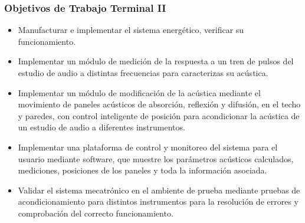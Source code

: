 \subsubsection*{Objetivos de Trabajo Terminal II}
\begin{itemize}
    \item Manufacturar e implementar el sistema energético, verificar su funcionamiento.
    \item Implementar un módulo de medición de la respuesta a un tren de pulsos del estudio de audio a distintas frecuencias para caracterizas su acústica.
    \item Implementar un módulo de modificación de la acústica mediante el movimiento de paneles acústicos de absorción, reflexión y difusión, en el techo y paredes, con control inteligente de posición para acondicionar la acústica de un estudio de audio a diferentes instrumentos.
    \item Implementar una plataforma de control y monitoreo del sistema para el usuario mediante software, que muestre los parámetros acústicos calculados, mediciones, posiciones de los paneles y toda la información asociada.
    \item Validar el sistema mecatrónico en el ambiente de prueba mediante pruebas de acondicionamiento para distintos instrumentos para la resolución de errores y comprobación del correcto funcionamiento.
\end{itemize}
\hfill \break
